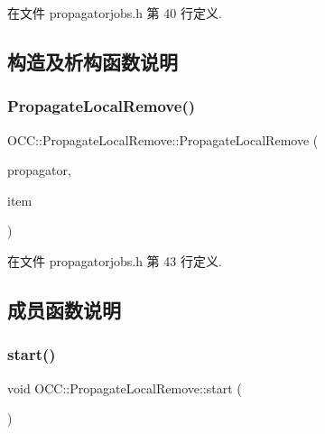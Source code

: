 在文件 propagatorjobs.\+h 第 40 行定义.



\subsection{构造及析构函数说明}
\mbox{\label{class_o_c_c_1_1_propagate_local_remove_ab7e23118741947f6f1ddfdee1b4ed336}} 
\subsubsection{\texorpdfstring{Propagate\+Local\+Remove()}{PropagateLocalRemove()}}
{\footnotesize\ttfamily O\+C\+C\+::\+Propagate\+Local\+Remove\+::\+Propagate\+Local\+Remove (\begin{DoxyParamCaption}\item[{\hyperlink{class_o_c_c_1_1_owncloud_propagator}{Owncloud\+Propagator} $\ast$}]{propagator,  }\item[{const \hyperlink{namespace_o_c_c_acb6b0db82893659fbd0c98d3c5b8e2b8}{Sync\+File\+Item\+Ptr} \&}]{item }\end{DoxyParamCaption})}



在文件 propagatorjobs.\+h 第 43 行定义.



\subsection{成员函数说明}
\mbox{\label{class_o_c_c_1_1_propagate_local_remove_af810729c9c8ca5d51d1ad019d27f6909}} 
\subsubsection{\texorpdfstring{start()}{start()}}
{\footnotesize\ttfamily void O\+C\+C\+::\+Propagate\+Local\+Remove\+::start (\begin{DoxyParamCaption}{ }\end{DoxyParamCaption})\hspace{0.3cm}{\ttfamily [virtual]}}




